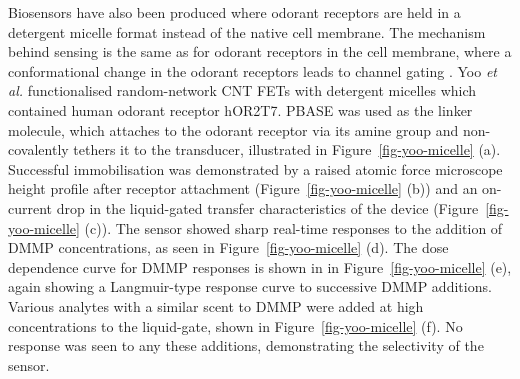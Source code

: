 \documentclass[
  a4paper,
]{scrbook}
\begin{document}
Biosensors have also been produced where odorant receptors are held in a
detergent micelle format instead of the native cell membrane. The
mechanism behind sensing is the same as for odorant receptors in the
cell membrane, where a conformational change in the odorant receptors
leads to channel gating \autocite{Dung2018,Yoo2022}. Yoo \emph{et al.}
functionalised random-network CNT FETs with detergent micelles which
contained human odorant receptor hOR2T7. PBASE was used as the linker
molecule, which attaches to the odorant receptor via its amine group and
non-covalently tethers it to the transducer, illustrated in
Figure~\ref{fig-yoo-micelle} (a). Successful immobilisation was
demonstrated by a raised atomic force microscope height profile after
receptor attachment (Figure~\ref{fig-yoo-micelle} (b)) and an on-current
drop in the liquid-gated transfer characteristics of the device
(Figure~\ref{fig-yoo-micelle} (c)). The sensor showed sharp real-time
responses to the addition of DMMP concentrations, as seen in
Figure~\ref{fig-yoo-micelle} (d). The dose dependence curve for DMMP
responses is shown in in Figure~\ref{fig-yoo-micelle} (e), again showing
a Langmuir-type response curve to successive DMMP additions. Various
analytes with a similar scent to DMMP were added at high concentrations
to the liquid-gate, shown in Figure~\ref{fig-yoo-micelle} (f). No
response was seen to any these additions, demonstrating the selectivity
of the sensor.
\end{document}
